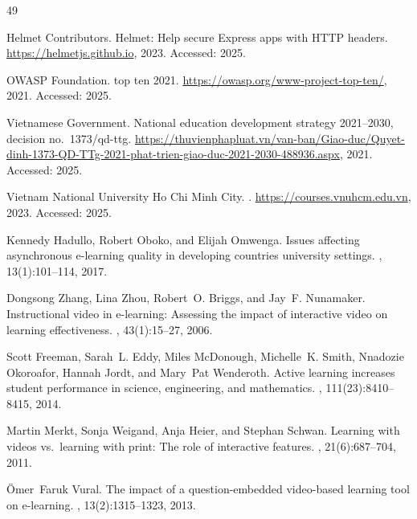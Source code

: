 \begin{thebibliography}{49}

{Helmet Contributors}.
\newblock Helmet: Help secure {Express} apps with {HTTP} headers.
\newblock \url{https://helmetjs.github.io}, 2023.
\newblock Accessed: 2025.

{OWASP Foundation}.
 top ten 2021.
\newblock \url{https://owasp.org/www-project-top-ten/}, 2021.
\newblock Accessed: 2025.

{Vietnamese Government}.
\newblock National education development strategy 2021--2030, decision no.\ 1373/qd-ttg.
\newblock \url{https://thuvienphapluat.vn/van-ban/Giao-duc/Quyet-dinh-1373-QD-TTg-2021-phat-trien-giao-duc-2021-2030-488936.aspx}, 2021.
\newblock Accessed: 2025.

{Vietnam National University Ho Chi Minh City}.
.
\newblock \url{https://courses.vnuhcm.edu.vn}, 2023.
\newblock Accessed: 2025.

Kennedy Hadullo, Robert Oboko, and Elijah Omwenga.
\newblock Issues affecting asynchronous e-learning quality in developing countries university settings.
, 13(1):101--114, 2017.

Dongsong Zhang, Lina Zhou, Robert~O. Briggs, and Jay~F. Nunamaker.
\newblock Instructional video in e-learning: Assessing the impact of interactive video on learning effectiveness.
, 43(1):15--27, 2006.

Scott Freeman, Sarah~L. Eddy, Miles McDonough, Michelle~K. Smith, Nnadozie Okoroafor, Hannah Jordt, and Mary~Pat Wenderoth.
\newblock Active learning increases student performance in science, engineering, and mathematics.
, 111(23):8410--8415, 2014.

Martin Merkt, Sonja Weigand, Anja Heier, and Stephan Schwan.
\newblock Learning with videos vs.\ learning with print: The role of interactive features.
, 21(6):687--704, 2011.

{\"O}mer~Faruk Vural.
\newblock The impact of a question-embedded video-based learning tool on e-learning.
, 13(2):1315--1323, 2013.


\end{thebibliography}
